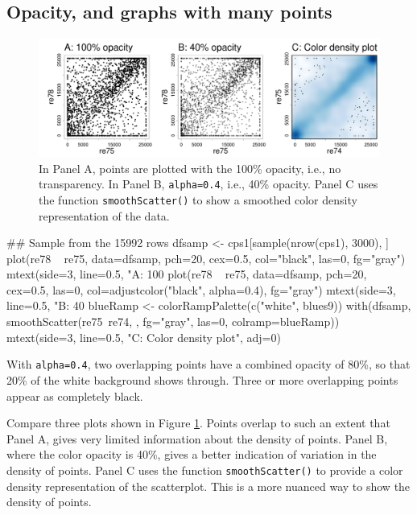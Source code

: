 \documentclass{tufte-book}\usepackage[]{graphicx}\usepackage[]{color}
\newcommand{\txtt}[1]{\texttt{#1}}
\begin{document}
\subsection*{Opacity, and graphs with many points}\label{ss:xpoint}

\begin{figure}
\begin{Schunk}


\centerline{\includegraphics[width=\textwidth]{figs/07-alpha-ex-1} }

\end{Schunk}
\caption{In Panel A, points are plotted with the 100\% opacity, i.e.,
  no transparency. In Panel B, \txtt{alpha=0.4}, i.e., 40\% opacity.
  Panel C uses the function \txtt{smoothScatter()} to show a smoothed
  color density representation of the data.\label{fig:alpha}}
\end{figure}

\noindent
\begin{Schunk}
\begin{Sinput}
## Sample from the 15992 rows
dfsamp <- cps1[sample(nrow(cps1), 3000), ]
plot(re78 ~ re75, data=dfsamp, pch=20, cex=0.5,
     col="black", las=0, fg="gray")
mtext(side=3, line=0.5, "A: 100%
plot(re78 ~ re75, data=dfsamp, pch=20, cex=0.5, las=0,
     col=adjustcolor("black", alpha=0.4), fg="gray")
mtext(side=3, line=0.5, "B: 40%
blueRamp <- colorRampPalette(c("white", blues9))
with(dfsamp, smoothScatter(re75~re74, , fg="gray",
                           las=0, colramp=blueRamp))
mtext(side=3, line=0.5, "C: Color density plot",
      adj=0)
\end{Sinput}
\end{Schunk}
With \txtt{alpha=0.4}, two overlapping points have a combined
opacity of 80\%, so that 20\% of the white background shows through.
Three or more overlapping points appear as completely black.

  Compare
three plots shown in Figure \ref{fig:alpha}.  Points overlap to such
an extent that Panel A, gives very limited information about the
density of points.  Panel B, where the color opacity is 40\%, gives a
better indication of variation in the density of points.  Panel C uses
the function \txtt{smoothScatter()} to provide a color density
representation of the scatterplot.  This is a more nuanced
way to show the density of points.
\end{document}
